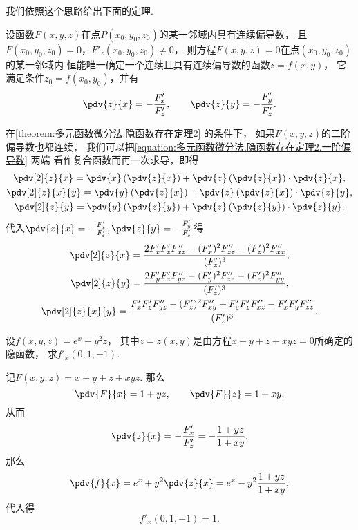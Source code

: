 我们依照这个思路给出下面的定理.
\begin{theorem}[隐函数存在定理2]\label{theorem:多元函数微分法.隐函数存在定理2}
设函数\(F(x,y,z)\)在点\(P(x_0,y_0,z_0)\)的某一邻域内具有连续偏导数，
且\(F(x_0,y_0,z_0)=0\)，\(F'_z(x_0,y_0,z_0) \neq 0\)，
则方程\(F(x,y,z)=0\)在点\((x_0,y_0,z_0)\)的某一邻域内
恒能唯一确定一个连续且具有连续偏导数的函数\(z=f(x,y)\)，
它满足条件\(z_0=f(x_0,y_0)\)，并有
\begin{equation}\label{equation:多元函数微分法.隐函数存在定理2.一阶偏导数}
	\pdv{z}{x}=-\frac{F'_x}{F'_z},
	\qquad
	\pdv{z}{y}=-\frac{F'_y}{F'_z}.
\end{equation}
\end{theorem}
在\cref{theorem:多元函数微分法.隐函数存在定理2} 的条件下，
如果\(F(x,y,z)\)的二阶偏导数也都连续，
我们可以把\cref{equation:多元函数微分法.隐函数存在定理2.一阶偏导数} 两端
看作复合函数而再一次求导，即得\begin{gather*}
	\pdv[2]{z}{x}
	= \pdv{x}\left(\pdv{z}{x}\right)
	+ \pdv{z}\left(\pdv{z}{x}\right) \cdot \pdv{z}{x}, \\
	\pdv[2]{z}{x}{y}
	= \pdv{y}\left(\pdv{z}{x}\right)
	+ \pdv{z}\left(\pdv{z}{x}\right) \cdot \pdv{z}{y}, \\
	\pdv[2]{z}{y}
	= \pdv{y}\left(\pdv{z}{y}\right)
	+ \pdv{z}\left(\pdv{z}{y}\right) \cdot \pdv{z}{y},
\end{gather*}
代入\(\pdv{z}{x}=-\frac{F'_x}{F'_z},
\pdv{z}{y}=-\frac{F'_y}{F'_z}\)得\begin{gather*}
	\pdv[2]{z}{x}
	= \frac{2 F'_x F'_z F''_{xz} - (F'_x)^2 F''_{zz} - (F'_z)^2 F''_{xx}}{(F'_z)^3}, \\
	\pdv[2]{z}{y}
	= \frac{2 F'_y F'_z F''_{yz} - (F'_y)^2 F''_{zz} - (F'_z)^2 F''_{yy}}{(F'_z)^3}, \\
	\pdv[2]{z}{x}{y}
	= \frac{F'_x F'_z F''_{yz} - (F'_z)^2 F''_{xy} + F'_y F'_z F''_{xz} - F'_x F'_y F''_{zz}}{(F'_z)^3}.
\end{gather*}

\begin{example}
设\(f(x,y,z) = e^x + y^2 z\)，
其中\(z=z(x,y)\)是由方程\(x+y+z+xyz=0\)所确定的隐函数，
求\(f'_x(0,1,-1)\).
\begin{solution}
记\(F(x,y,z) = x+y+z+xyz\).
那么\begin{equation*}
	\pdv{F}{x} = 1+yz, \qquad
	\pdv{F}{z} = 1+xy,
\end{equation*}
从而\begin{equation*}
	\pdv{z}{x} = -\frac{F'_x}{F'_z}
	= -\frac{1+yz}{1+xy}.
\end{equation*}
那么\begin{equation*}
	\pdv{f}{x}
	= e^x + y^2 \pdv{z}{x}
	= e^x - y^2 \frac{1+yz}{1+xy},
\end{equation*}
代入得\begin{equation*}
	f'_x(0,1,-1) = 1.
\end{equation*}
\end{solution}
\end{example}

